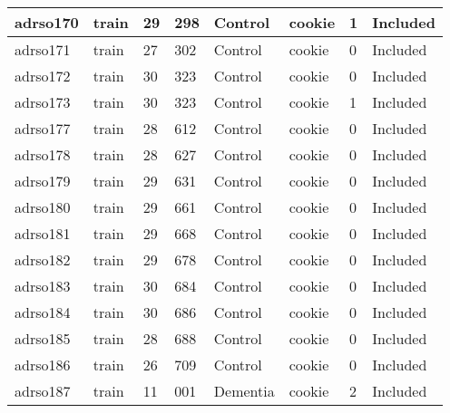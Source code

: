 \begin{center}
\begin{longtable}{|l|l|l|l|l|l|l|l|}
adrso170  & train            & 29           & 298         & Control              & cookie          & 1                & Included      \\ \hline
adrso171  & train            & 27           & 302         & Control              & cookie          & 0                & Included      \\ \hline
adrso172  & train            & 30           & 323         & Control              & cookie          & 0                & Included      \\ \hline
adrso173  & train            & 30           & 323         & Control              & cookie          & 1                & Included      \\ \hline
adrso177  & train            & 28           & 612         & Control              & cookie          & 0                & Included      \\ \hline
adrso178  & train            & 28           & 627         & Control              & cookie          & 0                & Included      \\ \hline
adrso179  & train            & 29           & 631         & Control              & cookie          & 0                & Included      \\ \hline
adrso180  & train            & 29           & 661         & Control              & cookie          & 0                & Included      \\ \hline
adrso181  & train            & 29           & 668         & Control              & cookie          & 0                & Included      \\ \hline
adrso182  & train            & 29           & 678         & Control              & cookie          & 0                & Included      \\ \hline
adrso183  & train            & 30           & 684         & Control              & cookie          & 0                & Included      \\ \hline
adrso184  & train            & 30           & 686         & Control              & cookie          & 0                & Included      \\ \hline
adrso185  & train            & 28           & 688         & Control              & cookie          & 0                & Included      \\ \hline
adrso186  & train            & 26           & 709         & Control              & cookie          & 0                & Included      \\ \hline
adrso187  & train            & 11           & 001         & Dementia             & cookie          & 2                & Included      \\ \hline

\end{longtable}
\end{center}
